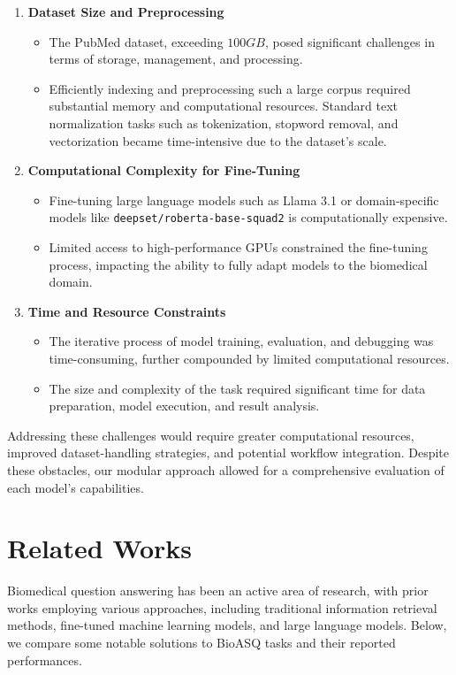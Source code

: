 \documentclass{article}
\begin{document}
\begin{enumerate}
    \item \textbf{Dataset Size and Preprocessing}
    \begin{itemize}
        \item The PubMed dataset, exceeding $100GB$, posed significant challenges in terms of storage, management, and processing.
        \item Efficiently indexing and preprocessing such a large corpus required substantial memory and computational resources. Standard text normalization tasks such as tokenization, stopword removal, and vectorization became time-intensive due to the dataset's scale.
    \end{itemize}
    \item \textbf{Computational Complexity for Fine-Tuning}
    \begin{itemize}
        \item Fine-tuning large language models such as Llama 3.1 or domain-specific models like \texttt{deepset/roberta-base-squad2} is computationally expensive.
        \item Limited access to high-performance GPUs constrained the fine-tuning process, impacting the ability to fully adapt models to the biomedical domain.
    \end{itemize}
    \item \textbf{Time and Resource Constraints}
    \begin{itemize}
        \item The iterative process of model training, evaluation, and debugging was time-consuming, further compounded by limited computational resources.
        \item The size and complexity of the task required significant time for data preparation, model execution, and result analysis.
    \end{itemize}
\end{enumerate}
Addressing these challenges would require greater computational resources, improved dataset-handling strategies, and potential workflow integration. Despite these obstacles, our modular approach allowed for a comprehensive evaluation of each model’s capabilities.

\section{Related Works}
Biomedical question answering has been an active area of research, with prior works employing various approaches, including traditional information retrieval methods, fine-tuned machine learning models, and large language models. Below, we compare some notable solutions to BioASQ tasks and their reported performances.
\end{document}
